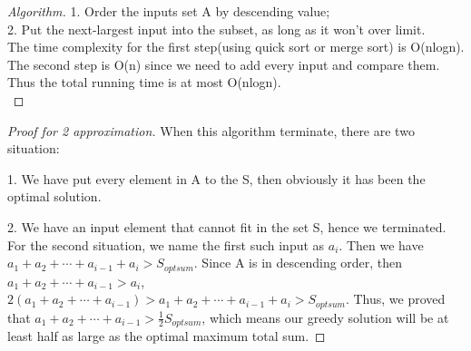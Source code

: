 \documentclass[12pt]{article}
\begin{document}
\begin{proof}[Algorithm]
	1. Order the inputs set A by descending value;\\
	2. Put the next-largest input into the subset, as long as it won't over limit.\\
	The time complexity for the first step(using quick sort or merge sort) is O(nlogn). The second step is O(n) since we need to add every input and compare them. Thus the total running time is at most O(nlogn).\\
\end{proof}
\begin{proof}[Proof for 2 approximation]
	When this algorithm terminate, there are two situation:
	
	1. We have put every element in A to the S, then obviously it has been the optimal solution.
	
	2. We have an input element that cannot fit in the set S, hence we terminated.\\
	For the second situation, we name the first such input as $a_i$. Then we have $a_1+a_2+\cdots+a_{i-1}+a_{i}>S_{optsum}$. Since A is in descending order, then $a_1+a_2+\cdots+a_{i-1}>a_i$, $2(a_1+a_2+\cdots+a_{i-1})>a_1+a_2+\cdots+a_{i-1}+a_{i}>S_{optsum}$. Thus, we proved that $a_1+a_2+\cdots+a_{i-1}>\frac{1}{2}S_{optsum}$, which means our greedy solution will be at least half as large as the optimal maximum total sum.
\end{proof}
\end{document}
